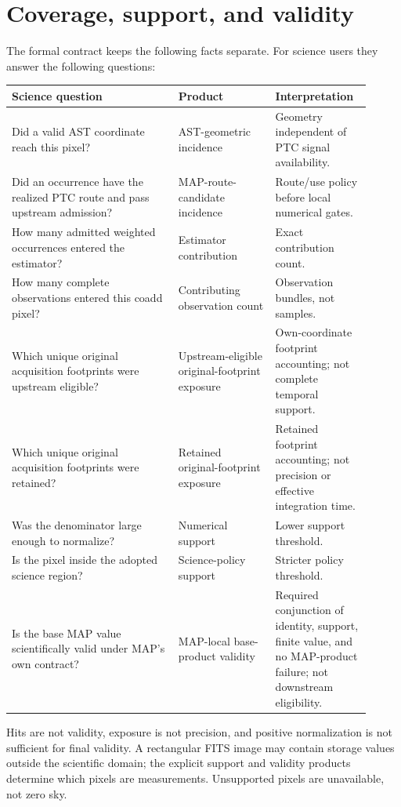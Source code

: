 \documentclass[10pt]{article}
\begin{document}
\clearpage
\section{Coverage, support, and validity}\label{sec:validity}
The formal contract keeps the following facts separate. For science users they answer
the following questions:
\begin{longtable}{L{0.43\linewidth}L{0.25\linewidth}L{0.23\linewidth}}
\toprule Science question & Product & Interpretation \\
\midrule
Did a valid AST coordinate reach this pixel? & AST-geometric incidence & Geometry independent of PTC signal availability.\\
Did an occurrence have the realized PTC route and pass upstream admission? & MAP-route-candidate incidence & Route/use policy before local numerical gates.\\
How many admitted weighted occurrences entered the estimator? & Estimator contribution & Exact contribution count.\\
How many complete observations entered this coadd pixel? & Contributing observation count & Observation bundles, not samples.\\
Which unique original acquisition footprints were upstream eligible? & Upstream-eligible original-footprint exposure & Own-coordinate footprint accounting; not complete temporal support.\\
Which unique original acquisition footprints were retained? & Retained original-footprint exposure & Retained footprint accounting; not precision or effective integration time.\\
Was the denominator large enough to normalize? & Numerical support & Lower support threshold.\\
Is the pixel inside the adopted science region? & Science-policy support & Stricter policy threshold.\\
Is the base MAP value scientifically valid under MAP's own contract? & MAP-local base-product validity & Required conjunction of identity, support, finite value, and no MAP-product failure; not downstream eligibility.\\
\bottomrule
\end{longtable}

Hits are not validity, exposure is not precision, and positive normalization
is not sufficient for final validity. A rectangular FITS image may contain
storage values outside the scientific domain; the explicit support and
validity products determine which pixels are measurements. Unsupported pixels
are unavailable, not zero sky.
\end{document}
